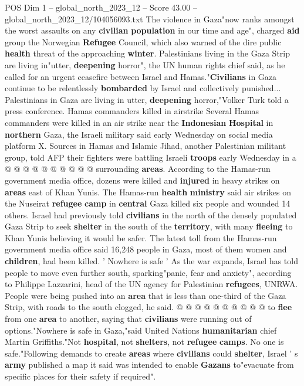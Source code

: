 \begin{textsample}{POS Dim 1 – global\_north\_2023\_12 – Score 43.00 – global\_north\_2023\_12/104056093.txt}
The violence in Gaza"now ranks amongst the worst assaults on any \textbf{civilian} \textbf{population} in our time and age", charged \textbf{aid} group the Norwegian \textbf{Refugee} Council, which also warned of the dire public \textbf{health} threat of the approaching \textbf{winter}.
Palestinians living in the Gaza Strip are living in"utter, \textbf{deepening} horror", the UN human rights chief said, as he called for an urgent ceasefire between Israel and Hamas."\textbf{Civilians} in Gaza continue to be relentlessly \textbf{bombarded} by Israel and collectively punished...
Palestinians in Gaza are living in utter, \textbf{deepening} horror,"Volker Turk told a press conference.
Hamas commanders killed in airstrike Several Hamas commanders were killed in an air strike near the \textbf{Indonesian} \textbf{Hospital} in \textbf{northern} Gaza, the Israeli military said early Wednesday on social media platform X.
Sources in Hamas and Islamic Jihad, another Palestinian militant group, told AFP their fighters were battling Israeli \textbf{troops} early Wednesday in a @ @ @ @ @ @ @ @ @ @ surrounding \textbf{areas}.
According to the Hamas-run government media office, dozens were killed and \textbf{injured} in heavy strikes on \textbf{areas} east of Khan Yunis.
The Hamas-run \textbf{health} \textbf{ministry} said air strikes on the Nuseirat \textbf{refugee} \textbf{camp} in \textbf{central} Gaza killed six people and wounded 14 others.
Israel had previously told \textbf{civilians} in the north of the densely populated Gaza Strip to seek \textbf{shelter} in the south of the \textbf{territory}, with many \textbf{fleeing} to Khan Yunis believing it would be safer.
The latest toll from the Hamas-run government media office said 16,248 people in Gaza, most of them women and \textbf{children}, had been killed. ' Nowhere is safe ' As the war expands, Israel has told people to move even further south, sparking"panic, fear and anxiety", according to Philippe Lazzarini, head of the UN agency for Palestinian \textbf{refugees}, UNRWA.
People were being pushed into an \textbf{area} that is less than one-third of the Gaza Strip, with roads to the south clogged, he said. @ @ @ @ @ @ @ @ @ @ to \textbf{flee} from one \textbf{area} to another, saying that \textbf{civilians} were running out of options."Nowhere is safe in Gaza,"said United Nations \textbf{humanitarian} chief Martin Griffiths."Not \textbf{hospital}, not \textbf{shelters}, not \textbf{refugee} \textbf{camps}.
No one is safe."Following demands to create \textbf{areas} where \textbf{civilians} could \textbf{shelter}, Israel ' s \textbf{army} published a map it said was intended to enable \textbf{Gazans} to"evacuate from specific places for their safety if required".

\end{textsample}
